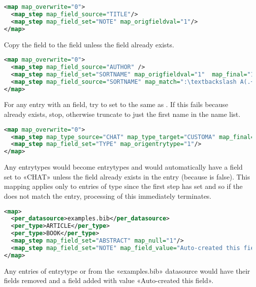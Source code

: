 \documentclass{ltxdockit}
\begin{document}
\begin{lstlisting}[language=xml,escapechar=+,mathescape=true]
<map map_overwrite="0">
  <map_step map_field_source="TITLE"/>
  <map_step map_field_set="NOTE" map_origfieldval="1"/>
</map>
\end{lstlisting}

\noindent Copy the  field to the  field unless the
 field already exists.

\begin{lstlisting}[language=xml,escapechar=:,mathescape=true]
<map map_overwrite="0">
  <map_step map_field_source="AUTHOR" />
  <map_step map_field_set="SORTNAME" map_origfieldval="1"  map_final="1"/>
  <map_step map_field_source="SORTNAME" map_match=":\textbackslash A(.+?)\textbackslash s+and.\ast" map\_replace="\$1:"/>
</map>
\end{lstlisting}

\noindent For any entry with an  field, try to set
 to the same as . If this fails because
 already exists, stop, otherwise truncate
 to just the first name in the name list.

\begin{lstlisting}[language=xml,escapechar=+,mathescape=true]
<map map_overwrite="0">
  <map_step map_type_source="CHAT" map_type_target="CUSTOMA" map_final="1"/>
  <map_step map_field_set="TYPE" map_origentrytype="1"/>
</map>
\end{lstlisting}

\noindent Any  entrytypes would become  entrytypes and 
would automatically have a  field set to 
«CHAT» unless the  field already exists in the entry (because
 is false). This mapping applies only to entries of type
 since the first step has  set and so if the
 does not match the entry, processing of this
 immediately terminates.

\begin{lstlisting}[language=xml,escapechar=+,mathescape=true]
<map>
  <per_datasource>examples.bib</per_datasource>
  <per_type>ARTICLE</per_type>
  <per_type>BOOK</per_type>
  <map_step map_field_set="ABSTRACT" map_null="1"/>
  <map_step map_field_set="NOTE" map_field_value="Auto-created this field"/>
</map>
\end{lstlisting}

\noindent Any entries of entrytype  or  from the
«examples.bib» datasource would have their 
fields removed and a  field added with value «Auto-created this field».
\end{document}
